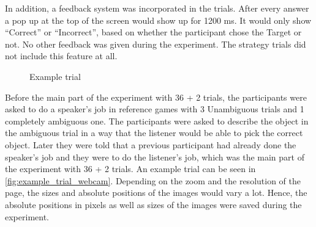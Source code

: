 In addition, a feedback system was incorporated in the trials. After every answer a pop up at the top of the screen would show up for 1200 ms. It would only show ``Correct'' or ``Incorrect'', based on whether the participant chose the Target or not. No other feedback was given during the experiment. The strategy trials did not include this feature at all. 

\begin{figure}
    \centering
    \caption{Example trial}
    \label{fig:example_trial_webcam}
\end{figure}

Before the main part of the experiment with 36 + 2 trials, the participants were asked to do a speaker's job in reference games with 3 Unambiguous trials and 1 completely ambiguous one. The participants were asked to describe the object in the ambiguous trial in a way that the listener would be able to pick the correct object. Later they were told that a previous participant had already done the speaker's job and they were to do the listener's job, which was the main part of the experiment with 36 + 2 trials. An example trial can be seen in \autoref{fig:example_trial_webcam}. Depending on the zoom and the resolution of the page, the sizes and absolute positions of the images would vary a lot. Hence, the absolute positions in pixels as well as sizes of the images were saved during the experiment. 

